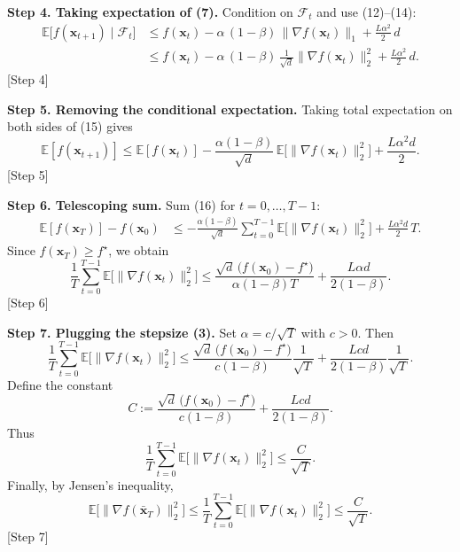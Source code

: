 \documentclass{article}
\newcommand{\E}{\mathbb{E}}
\begin{document}
\noindent\textbf{Step 4. Taking expectation of (7).}
Condition on $\mathcal{F}_{t}$ and use (12)–(14):
\begin{align}
\E\!\big[f(\bm{x}_{t+1})\mid\mathcal{F}_{t}\big]
&\le f(\bm{x}_{t})
   -\alpha\,(1-\beta)\,\|\nabla f(\bm{x}_{t})\|_{1}
   +\frac{L\alpha^{2}}{2}\,d                                                     \nonumber\\[1mm]
&\le f(\bm{x}_{t})
   -\alpha\,(1-\beta)\,\frac{1}{\sqrt{d}}\|\nabla f(\bm{x}_{t})\|_{2}^{2}
   +\frac{L\alpha^{2}}{2}\,d .                                                  \tag{15}
\end{align}
[Step 4]

\noindent\textbf{Step 5. Removing the conditional expectation.}
Taking total expectation on both sides of (15) gives
\[
\E[f(\bm{x}_{t+1})]
\le \E[f(\bm{x}_{t})]
   -\frac{\alpha(1-\beta)}{\sqrt{d}}\,
     \E\!\big[\|\nabla f(\bm{x}_{t})\|_{2}^{2}\big]
   +\frac{L\alpha^{2}d}{2}.                                                     \tag{16}
\]
[Step 5]

\noindent\textbf{Step 6. Telescoping sum.}
Sum (16) for $t=0,\dots,T-1$:
\begin{align}
\E[f(\bm{x}_{T})]-f(\bm{x}_{0})
&\le
   -\frac{\alpha(1-\beta)}{\sqrt{d}}\sum_{t=0}^{T-1}
        \E\!\big[\|\nabla f(\bm{x}_{t})\|_{2}^{2}\big]
   +\frac{L\alpha^{2}d}{2}\,T .                                                \tag{17}
\end{align}
Since $f(\bm{x}_{T})\ge f^{\star}$, we obtain
\[
\frac{1}{T}\sum_{t=0}^{T-1}
   \E\!\big[\|\nabla f(\bm{x}_{t})\|_{2}^{2}\big]
\le
\frac{\sqrt{d}\,\big(f(\bm{x}_{0})-f^{\star}\big)}{\alpha(1-\beta)T}
   +\frac{L\alpha d}{2(1-\beta)} .                                            \tag{18}
\]
[Step 6]

\noindent\textbf{Step 7. Plugging the stepsize (3).}
Set $\alpha = c/\sqrt{T}$ with $c>0$.  Then
\[
\frac{1}{T}\sum_{t=0}^{T-1}
   \E\!\big[\|\nabla f(\bm{x}_{t})\|_{2}^{2}\big]
\le
\frac{\sqrt{d}\,\big(f(\bm{x}_{0})-f^{\star}\big)}{c(1-\beta)}\frac{1}{\sqrt{T}}
   +\frac{L c d}{2(1-\beta)}\frac{1}{\sqrt{T}} .                               \tag{19}
\]
Define the constant
\[
C:=\frac{\sqrt{d}\,\big(f(\bm{x}_{0})-f^{\star}\big)}{c(1-\beta)}
      +\frac{L c d}{2(1-\beta)} .
\tag{20}
\]
Thus
\[
\frac{1}{T}\sum_{t=0}^{T-1}
   \E\!\big[\|\nabla f(\bm{x}_{t})\|_{2}^{2}\big]\le \frac{C}{\sqrt{T}} .
\tag{21}
\]
Finally, by Jensen’s inequality,
\[
\E\!\big[\|\nabla f(\bar{\bm{x}}_{T})\|_{2}^{2}\big]
\le
\frac{1}{T}\sum_{t=0}^{T-1}
   \E\!\big[\|\nabla f(\bm{x}_{t})\|_{2}^{2}\big]
\le \frac{C}{\sqrt{T}} .
\tag{22}
\]
[Step 7]
\end{document}
